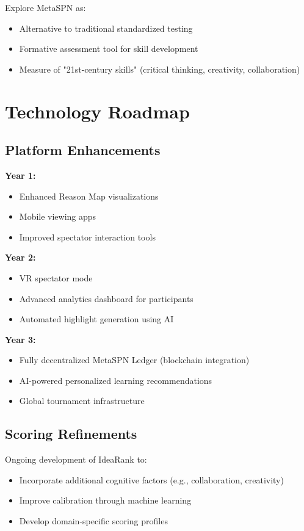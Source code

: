 Explore MetaSPN as:
\begin{itemize}[leftmargin=*]
  \item Alternative to traditional standardized testing
  \item Formative assessment tool for skill development
  \item Measure of "21st-century skills" (critical thinking, creativity, collaboration)
\end{itemize}

\section{Technology Roadmap}

\subsection{Platform Enhancements}

\textbf{Year 1:}
\begin{itemize}[leftmargin=*]
  \item Enhanced Reason Map visualizations
  \item Mobile viewing apps
  \item Improved spectator interaction tools
\end{itemize}

\textbf{Year 2:}
\begin{itemize}[leftmargin=*]
  \item VR spectator mode
  \item Advanced analytics dashboard for participants
  \item Automated highlight generation using AI
\end{itemize}

\textbf{Year 3:}
\begin{itemize}[leftmargin=*]
  \item Fully decentralized MetaSPN Ledger (blockchain integration)
  \item AI-powered personalized learning recommendations
  \item Global tournament infrastructure
\end{itemize}

\subsection{Scoring Refinements}

Ongoing development of IdeaRank to:
\begin{itemize}[leftmargin=*]
  \item Incorporate additional cognitive factors (e.g., collaboration, creativity)
  \item Improve calibration through machine learning
  \item Develop domain-specific scoring profiles
\end{itemize}

